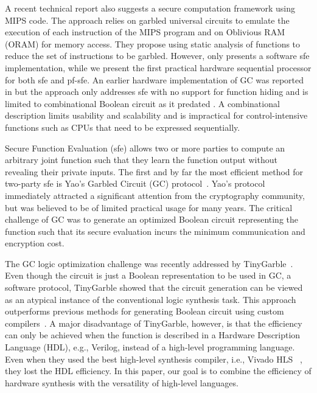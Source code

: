 A recent technical report \cite{wang2016secure} also suggests a secure computation framework using MIPS code. The approach relies on garbled universal circuits to emulate the execution of each instruction of the MIPS program and on Oblivious RAM (ORAM) for memory access. They propose using static analysis of functions to reduce the set of instructions to be garbled. However, \cite{wang2016secure} only presents a software \acrshort{sfe} implementation, while we present the first practical hardware sequential processor for both \acrshort{sfe} and \acrshort{pf-sfe}. An earlier hardware implementation of GC was reported in \cite{jarvinen2010garbled} but the approach only addresses \acrshort{sfe} with no support for function hiding and is limited to combinational Boolean circuit as it predated \cite{songhori2015tinygarble}. A combinational description limits usability and scalability and is impractical for control-intensive functions such as CPUs that need to be expressed sequentially.


Secure Function Evaluation (\acrshort{sfe}) allows two or more parties to compute an arbitrary joint function such that they learn the function output without revealing their private inputs.
The first and by far the most efficient method for two-party \acrshort{sfe} is Yao's Garbled Circuit (GC) protocol~\cite{yao1986generate}.
Yao's protocol immediately attracted a significant attention from the cryptography community, but was believed to be of limited practical usage for many years.
The critical challenge of GC was to generate an optimized Boolean circuit representing the function such that its secure evaluation incurs the minimum communication and encryption cost.

The GC logic optimization challenge was recently addressed by TinyGarble~\cite{songhori2015tinygarble}.
Even though the circuit is just a Boolean representation to be used in GC, a software protocol, TinyGarble showed that the circuit generation can be viewed as an atypical instance of the conventional logic synthesis task.
This approach outperforms previous methods for generating Boolean circuit using custom compilers~\cite{malkhi2004fairplay,holzer2012secure, rastogi2014wysteria,demmler2015aby,liu2015oblivm,mood2016frigate}.
A major disadvantage of TinyGarble, however, is that the efficiency can only be achieved when the function is described in a Hardware Description Language (HDL), e.g., Verilog, instead of a high-level programming language.
Even when they used the best high-level synthesis compiler, i.e., Vivado HLS ~\cite{tool:Vivado}, they lost the HDL efficiency.
In this paper, our goal is to combine the efficiency of hardware synthesis with the versatility of high-level languages.

